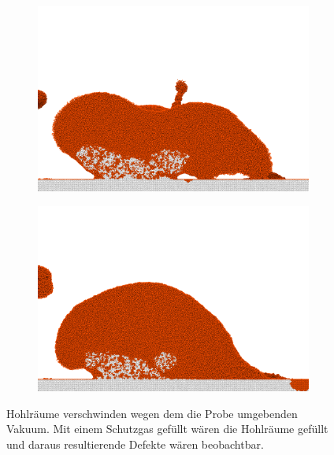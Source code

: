 		\begin{figure}[!ht]
			\centering
			\begin{subfigure}{0.49\textwidth}
				\centering
				\includegraphics[width=\textwidth]{chapter/main/single/img/power_calibration/v10_p100_c225.png}
				\label{fig:vel10_p100_earlier}
			\end{subfigure}
			\begin{subfigure}{0.49\textwidth}
				\centering
				\includegraphics[width=\textwidth]{chapter/main/single/img/power_calibration/v10_p100_c280.png}
				\label{fig:vel10_p100_later}
			\end{subfigure}
			\caption{Hohlräume verschwinden wegen dem die Probe umgebenden Vakuum. Mit einem
			Schutzgas gefüllt wären die Hohlräume gefüllt und daraus resultierende Defekte wären
			beobachtbar.}
			\label{fig:vel10_p100}
		\end{figure}

